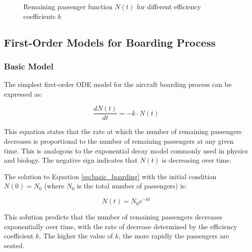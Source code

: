 \documentclass[12pt,a4paper]{article}
\begin{document}
\begin{figure}[H]
\centering
{}
\caption{Remaining passenger function $N(t)$ for different efficiency coefficients $k$}
\label{fig:remaining_passengers}
\end{figure}

\subsection{First-Order Models for Boarding Process}

\subsubsection{Basic Model}

The simplest first-order ODE model for the aircraft boarding process can be expressed as:

\begin{equation}
\frac{dN(t)}{dt} = -k \cdot N(t)
\label{eq:basic_boarding}
\end{equation}

This equation states that the rate at which the number of remaining passengers decreases is proportional to the number of remaining passengers at any given time. This is analogous to the exponential decay model commonly used in physics and biology. The negative sign indicates that $N(t)$ is decreasing over time.

The solution to Equation \ref{eq:basic_boarding} with the initial condition $N(0) = N_0$ (where $N_0$ is the total number of passengers) is:

\begin{equation}
N(t) = N_0 e^{-kt}
\label{eq:basic_solution}
\end{equation}

This solution predicts that the number of remaining passengers decreases exponentially over time, with the rate of decrease determined by the efficiency coefficient $k$. The higher the value of $k$, the more rapidly the passengers are seated.
\end{document}
